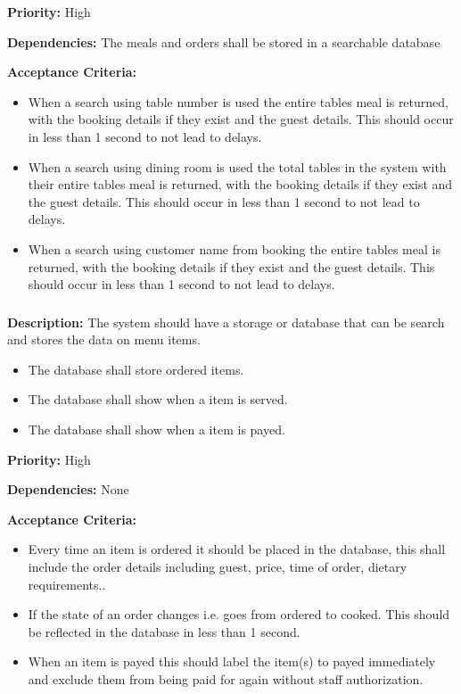 \documentclass{article}
\begin{document}
\textbf{Priority:} High


\textbf{Dependencies:} The meals and orders shall be stored in a searchable database


\textbf{Acceptance Criteria:} 
\begin{itemize}
    \item When a search using table number is used the entire tables meal is returned, with the booking details if they exist and the guest details. This should occur in less than 1 second to not lead to delays.
    \item When a search using dining room is used the total tables in the system with their entire tables meal is returned, with the booking details if they exist and the guest details. This should occur in less than 1 second to not lead to delays.
    \item When a search using customer name from booking the entire tables meal is returned, with the booking details if they exist and the guest details. This should occur in less than 1 second to not lead to delays.
\end{itemize}


\subsubsection{}
\textbf{Description:} The system should have a storage or database that can be search and stores the data on menu items.
\begin{itemize}
    \item The database shall store ordered items.
    \item The database shall show when a item is served.
    \item The database shall show when a item is payed.
\end{itemize}


\textbf{Priority:} High


\textbf{Dependencies:} None


\textbf{Acceptance Criteria:} \begin{itemize}
    \item Every time an item is ordered it should be placed in the database, this shall include the order details including guest, price, time of order, dietary requirements..
    \item If the state of an order changes i.e. goes from ordered to cooked. This should be reflected in the database in less than 1 second. 
    \item When an item is payed this should label the item(s) to payed immediately and exclude them from being paid for again without staff authorization.
\end{itemize}
\end{document}
